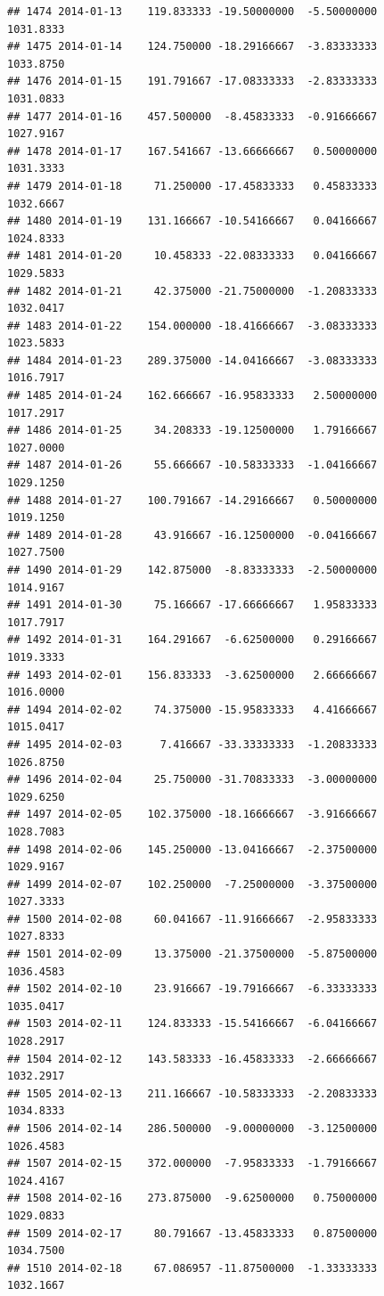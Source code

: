 \documentclass[
]{article}
\begin{document}
\begin{verbatim}
## 1474 2014-01-13    119.833333 -19.50000000  -5.50000000    1031.8333
## 1475 2014-01-14    124.750000 -18.29166667  -3.83333333    1033.8750
## 1476 2014-01-15    191.791667 -17.08333333  -2.83333333    1031.0833
## 1477 2014-01-16    457.500000  -8.45833333  -0.91666667    1027.9167
## 1478 2014-01-17    167.541667 -13.66666667   0.50000000    1031.3333
## 1479 2014-01-18     71.250000 -17.45833333   0.45833333    1032.6667
## 1480 2014-01-19    131.166667 -10.54166667   0.04166667    1024.8333
## 1481 2014-01-20     10.458333 -22.08333333   0.04166667    1029.5833
## 1482 2014-01-21     42.375000 -21.75000000  -1.20833333    1032.0417
## 1483 2014-01-22    154.000000 -18.41666667  -3.08333333    1023.5833
## 1484 2014-01-23    289.375000 -14.04166667  -3.08333333    1016.7917
## 1485 2014-01-24    162.666667 -16.95833333   2.50000000    1017.2917
## 1486 2014-01-25     34.208333 -19.12500000   1.79166667    1027.0000
## 1487 2014-01-26     55.666667 -10.58333333  -1.04166667    1029.1250
## 1488 2014-01-27    100.791667 -14.29166667   0.50000000    1019.1250
## 1489 2014-01-28     43.916667 -16.12500000  -0.04166667    1027.7500
## 1490 2014-01-29    142.875000  -8.83333333  -2.50000000    1014.9167
## 1491 2014-01-30     75.166667 -17.66666667   1.95833333    1017.7917
## 1492 2014-01-31    164.291667  -6.62500000   0.29166667    1019.3333
## 1493 2014-02-01    156.833333  -3.62500000   2.66666667    1016.0000
## 1494 2014-02-02     74.375000 -15.95833333   4.41666667    1015.0417
## 1495 2014-02-03      7.416667 -33.33333333  -1.20833333    1026.8750
## 1496 2014-02-04     25.750000 -31.70833333  -3.00000000    1029.6250
## 1497 2014-02-05    102.375000 -18.16666667  -3.91666667    1028.7083
## 1498 2014-02-06    145.250000 -13.04166667  -2.37500000    1029.9167
## 1499 2014-02-07    102.250000  -7.25000000  -3.37500000    1027.3333
## 1500 2014-02-08     60.041667 -11.91666667  -2.95833333    1027.8333
## 1501 2014-02-09     13.375000 -21.37500000  -5.87500000    1036.4583
## 1502 2014-02-10     23.916667 -19.79166667  -6.33333333    1035.0417
## 1503 2014-02-11    124.833333 -15.54166667  -6.04166667    1028.2917
## 1504 2014-02-12    143.583333 -16.45833333  -2.66666667    1032.2917
## 1505 2014-02-13    211.166667 -10.58333333  -2.20833333    1034.8333
## 1506 2014-02-14    286.500000  -9.00000000  -3.12500000    1026.4583
## 1507 2014-02-15    372.000000  -7.95833333  -1.79166667    1024.4167
## 1508 2014-02-16    273.875000  -9.62500000   0.75000000    1029.0833
## 1509 2014-02-17     80.791667 -13.45833333   0.87500000    1034.7500
## 1510 2014-02-18     67.086957 -11.87500000  -1.33333333    1032.1667

\end{verbatim}
\end{document}

